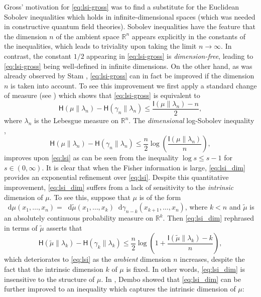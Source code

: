 \documentclass[a4paper,twoside,11pt,reqno]{amsart}
\newcommand*\diff{\mathop{}\!\mathrm{d}}
\newcommand{\R}{\mathbb{R}} %
\newcommand{\II}{\mathsf{I}}
\newcommand{\HH}{\mathsf{H}}
\begin{document}
Gross' motivation for \eqref{eq:lsi-gross} was to find a substitute for the Euclidean Sobolev inequalities which holds in infinite-dimensional spaces (which was needed in constructive quantum field theories). Sobolev inequalities have the feature that the dimension $n$ of the ambient space $\R^n$ appears explicitly in the constants of the inequalities, which leads to triviality upon taking the limit $n\to\infty$. In contrast, the constant $1/2$ appearing in \eqref{eq:lsi-gross} is \emph{dimension-free}, leading to \eqref{eq:lsi-gross} being well-defined in infinite dimensions. On the other hand, as was already observed by Stam \cite{Sta59}, \eqref{eq:lsi-gross} can in fact be improved if the dimension $n$ is taken into account. To see this improvement we first apply a standard change of measure (see \cite{Wei78}) which shows that \eqref{eq:lsi-gross} is equivalent to
\begin{equation} \label{eq:lsi}
\HH(\mu\|\lambda_n) - \HH(\gamma_n\|\lambda_n) \leq \frac{\II(\mu\|\lambda_n)-n}{2},
\end{equation}
where $\lambda_n$ is the Lebesgue measure on $\R^n$. The \emph{dimensional} log-Sobolev inequality \cite{Sta59, CC84, Car91},
\begin{equation} \label{eq:lsi_dim}
\HH(\mu\|\lambda_n) - \HH(\gamma_n\|\lambda_n) \leq \frac{n}{2}\log\left(\frac{\II(\mu\|\lambda_n)}{n}\right),
\end{equation}
improves upon \eqref{eq:lsi} as can be seen from the inequality $\log s\le s-1$ for $s\in (0,\infty)$.  It is clear that when the Fisher information is large, \eqref{eq:lsi_dim} provides an exponential refinement over \eqref{eq:lsi}. Despite this quantitative improvement,  \eqref{eq:lsi_dim} suffers from a lack of sensitivity to the \emph{intrinsic} dimension of $\mu$.  To see this, suppose that $\mu$ is of the form $\diff\mu(x_1,\ldots, x_n)=\diff\tilde\mu(x_1,\ldots,x_k)\diff\gamma_{n-k}(x_{k+1},\ldots,x_n)$, where $k<n$ and $\tilde \mu$ is an absolutely continuous probability measure on $\R^k$.  Then \eqref{eq:lsi_dim} rephrased in terms of $\tilde{\mu}$ asserts that
\begin{equation}
\HH(\tilde \mu\|\lambda_k) - \HH(\gamma_k\|\lambda_k) \leq \frac{n}{2}\log\left(1+ \frac{\II(\tilde \mu\|\lambda_k) - k}{n}\right),
\end{equation}
which deteriorates to \eqref{eq:lsi} as the \emph{ambient} dimension $n$ increases, despite the fact that the intrinsic dimension $k$ of $\mu$ is fixed.  In other words, \eqref{eq:lsi_dim} is insensitive to the structure of $\mu$.  In \cite[p.~12]{Dem90}, Dembo showed that \eqref{eq:lsi_dim} can be further improved to an inequality which captures the intrinsic dimension of $\mu$:
\end{document}
